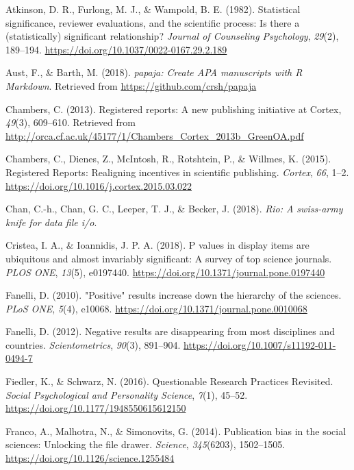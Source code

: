 \documentclass[british,,jou,floatsintext]{apa6}
\begin{document}
\leavevmode\hypertarget{ref-Atkinson1982}{}%
Atkinson, D. R., Furlong, M. J., \& Wampold, B. E. (1982). Statistical significance, reviewer evaluations, and the scientific process: Is there a (statistically) significant relationship? \emph{Journal of Counseling Psychology}, \emph{29}(2), 189--194. \url{https://doi.org/10.1037/0022-0167.29.2.189}

\leavevmode\hypertarget{ref-R-papaja}{}%
Aust, F., \& Barth, M. (2018). \emph{papaja: Create APA manuscripts with R Markdown}. Retrieved from \url{https://github.com/crsh/papaja}

\leavevmode\hypertarget{ref-Chambers2013}{}%
Chambers, C. (2013). Registered reports: A new publishing initiative at Cortex, \emph{49}(3), 609--610. Retrieved from \url{http://orca.cf.ac.uk/45177/1/Chambers_Cortex_2013b_GreenOA.pdf}

\leavevmode\hypertarget{ref-Chambers2015}{}%
Chambers, C., Dienes, Z., McIntosh, R., Rotshtein, P., \& Willmes, K. (2015). Registered Reports: Realigning incentives in scientific publishing. \emph{Cortex}, \emph{66}, 1--2. \url{https://doi.org/10.1016/j.cortex.2015.03.022}

\leavevmode\hypertarget{ref-R-rio}{}%
Chan, C.-h., Chan, G. C., Leeper, T. J., \& Becker, J. (2018). \emph{Rio: A swiss-army knife for data file i/o}.

\leavevmode\hypertarget{ref-Cristea2018}{}%
Cristea, I. A., \& Ioannidis, J. P. A. (2018). P values in display items are ubiquitous and almost invariably significant: A survey of top science journals. \emph{PLOS ONE}, \emph{13}(5), e0197440. \url{https://doi.org/10.1371/journal.pone.0197440}

\leavevmode\hypertarget{ref-Fanelli2010}{}%
Fanelli, D. (2010). "Positive" results increase down the hierarchy of the sciences. \emph{PLoS ONE}, \emph{5}(4), e10068. \url{https://doi.org/10.1371/journal.pone.0010068}

\leavevmode\hypertarget{ref-Fanelli2012}{}%
Fanelli, D. (2012). Negative results are disappearing from most disciplines and countries. \emph{Scientometrics}, \emph{90}(3), 891--904. \url{https://doi.org/10.1007/s11192-011-0494-7}

\leavevmode\hypertarget{ref-Fiedler2016}{}%
Fiedler, K., \& Schwarz, N. (2016). Questionable Research Practices Revisited. \emph{Social Psychological and Personality Science}, \emph{7}(1), 45--52. \url{https://doi.org/10.1177/1948550615612150}

\leavevmode\hypertarget{ref-Franco2014}{}%
Franco, A., Malhotra, N., \& Simonovits, G. (2014). Publication bias in the social sciences: Unlocking the file drawer. \emph{Science}, \emph{345}(6203), 1502--1505. \url{https://doi.org/10.1126/science.1255484}
\end{document}
